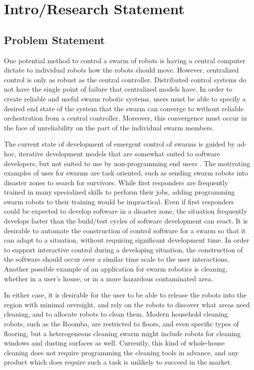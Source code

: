 \documentclass[]{article}
\begin{document}
\section{Intro/Research Statement}

\subsection{Problem Statement}

One potential method to control a swarm of robots is having a central computer dictate to individual robots how the robots should move.
However, centralized control is only as robust as the central controller. 
Distributed control systems do not have the single point of failure that centralized models have. 
In order to create reliable and useful swarm robotic systems, users must be able to specify a desired end state of the system that the swarm can converge to without reliable orchestration from a central controller. 
Moreover, this convergence must occur in the face of unreliability on the part of the individual swarm members. 

The current state of development of emergent control of swarms is guided by ad-hoc, iterative development models that are somewhat suited to software developers, but not suited to use by non-programming end users \cite{palmer2005behavioral}.
The motivating examples of uses for swarms are task oriented, such as sending swarm robots into disaster zones to search for survivors. 
While first responders are frequently trained in many specialized skills to perform their jobs, adding programming swarm robots to their training would be impractical. 
Even if first responders could be expected to develop software in a disaster zone, the situation frequently develops faster than the build/test cycles of software development can react. 
It is desirable to automate the construction of control software for a swarm so that it can adapt to a situation, without requiring significant development time. 
In order to support interactive control during a developing situation, the construction of the software should occur over a similar time scale to the user interactions.
Another possible example of an application for swarm robotics is cleaning, whether in a user's house, or in a more hazardous contaminated area. 

In either case, it is desirable for the user to be able to release the robots into the region with minimal oversight, and rely on the robots to discover what areas need cleaning, and to allocate robots to clean them. 
Modern household cleaning robots, such as the Roomba, are restricted to floors, and even specific types of flooring, but a heterogeneous cleaning swarm might include robots for cleaning windows and dusting surfaces as well. 
Currently, this kind of whole-house cleaning does not require programming the cleaning tools in advance, and any product which does require such a task is unlikely to succeed in the market. 
\end{document}
